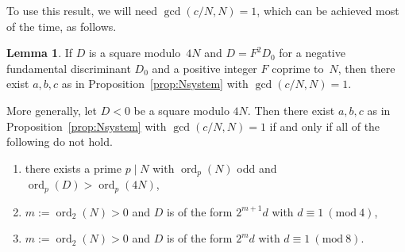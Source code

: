 \documentclass{amsart}
\DeclareMathOperator{\ord}{ord}
\numberwithin{equation}{section}
\theoremstyle{definition}
\newtheorem{lemma}[equation]{Lemma}
\begin{document}
To use this result, we will need $\gcd(c/N,N)=1$, which can
be achieved most of the time, as follows.
\begin{lemma}\label{lem:exceptions}
If $D$ is a square modulo~$4N$ and
$D = F^2D_0$ for a negative fundamental discriminant $D_0$
and a positive integer $F$ coprime to~$N$, then
there exist $a,b,c$ as in Proposition~\ref{prop:Nsystem}
with $\gcd(c/N,N) = 1$.

	More generally, let $D<0$ be a square modulo $4N$.
	Then there exist $a,b,c$ as in Proposition~\ref{prop:Nsystem}
	with $\gcd(c/N,N) = 1$
	if and only if all of the following do not hold.
	\begin{enumerate}
		\item there exists a prime $p\mid N$ with $\ord_p(N)$ odd and $\ord_p(D) > \ord_p(4N)$,
		\item $m:=\ord_2(N) > 0$ and $D$ is of the form $2^{m+1}d$
		with
		$d\equiv 1\ (\mathrm{mod}\ 4)$,
		\item $m:=\ord_2(N) > 0$ and $D$ is of the form $2^{m}d$
		with
		$d\equiv 1\ (\mathrm{mod}\ 8)$.
	\end{enumerate}
\end{lemma}
\end{document}
